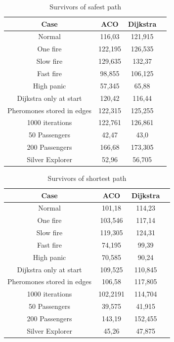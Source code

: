 \begin{table}[ht]
\caption{Survivors of safest path} 				%
\centering										%
\begin{tabular}{c c c c}						%
\hline
\hline 											%
Case & ACO & Dijkstra \\[0.5ex]%
\hline											%
Normal & 116,03 & 121,915 \\							%
One fire & 122,195 & 126,535 \\
Slow fire & 129,635 & 132,37 \\
Fast fire & 98,855 & 106,125 \\
High panic & 57,345 & 65,88 \\
Dijkstra only at start & 120,42 & 116,44 \\
Pheromones stored in edges & 122,315 & 125,255 \\
1000 iterations & 122,761 & 126,861 \\
50 Passengers & 42,47 & 43,0 \\
200 Passengers & 166,68 & 173,305 \\ 
Silver Explorer & 52,96 & 56,705 \\ [1ex]						%
\hline														%

\end{tabular}
\label{table:tableSafest}								
\end{table}


\begin{table}[ht]
\caption{Survivors of shortest path} 				%
\centering										%
\begin{tabular}{c c c c}						%
\hline
\hline 											%
Case & ACO & Dijkstra \\[0.5ex]%
\hline											%
Normal & 101,18 & 114,23 \\							%
One fire & 103,546 & 117,14 \\
Slow fire & 119,305 & 124,31 \\
Fast fire & 74,195 & 99,39 \\
High panic & 70,585 & 90,24 \\
Dijkstra only at start & 109,525 & 110,845 \\
Pheromones stored in edges & 106,58 & 117,805 \\
1000 iterations & 102,2191 & 114,704 \\
50 Passengers & 39,575 & 41,915 \\ 
200 Passengers & 143,19 & 152,455 \\
Silver Explorer & 45,26 & 47,875 \\ [1ex]						%
\hline														%

\end{tabular}
\label{table:tableShortest}								
\end{table}